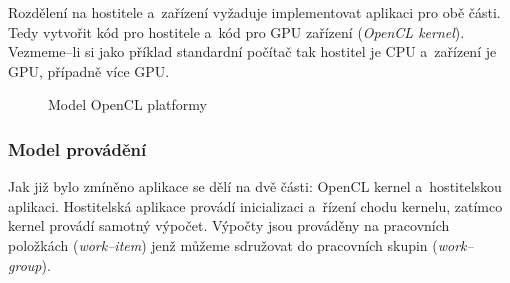  Rozdělení na hostitele a~zařízení vyžaduje implementovat aplikaci pro obě části. Tedy
vytvořit kód pro hostitele a~kód pro GPU zařízení ({\it OpenCL kernel}). Vezmeme--li si jako
příklad standardní počítač tak hostitel je CPU a~zařízení je GPU, případně více GPU.
\begin{figure}[ht]
    \begin{center}
    \end{center}
    \caption{Model OpenCL platformy \cite{Khronos:2015}}
    \label{platform}
\end{figure}
\subsubsection{Model provádění}
Jak již bylo zmíněno aplikace se dělí na dvě části: OpenCL kernel a~hostitelskou aplikaci.
Hostitelská aplikace provádí inicializaci a~řízení chodu kernelu, zatímco kernel provádí samotný
výpočet. Výpočty jsou prováděny na pracovních položkách ({\it work--item}) jenž můžeme sdružovat do
pracovních skupin ({\it work--group}).

